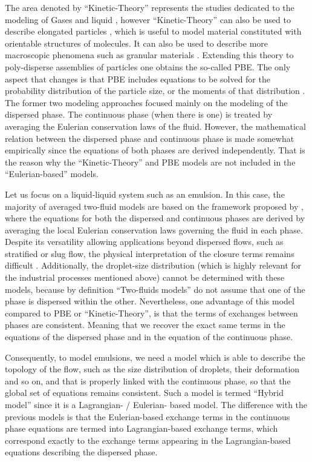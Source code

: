 The area denoted by ``Kinetic-Theory'' represents the studies dedicated to the modeling of Gases and liquid \citep{hansen2013theory,kardar2007statistical}, however  
``Kinetic-Theory'' can also be used to describe elongated particles \citet{curtiss1956kinetic}, which is useful to model material constituted with orientable structures of molecules.
It can also be used to describe more macroscopic phenomena such as granular materials \citet{rao2008introduction}.  
Extending this theory to poly-disperse assemblies of particles one obtains the so-called PBE. 
The only aspect that changes is that PBE includes equations to be solved for the probability distribution of the particle size, or the moments of that distribution \citep{fox2023generalized,randolph2012theory}. 
The former two modeling approaches focused mainly on the modeling of the dispersed phase.
The continuous phase (when there is one) is treated by averaging the Eulerian conservation laws of the fluid. 
However, the mathematical relation between the dispersed phase and continuous phase is made somewhat empirically since the equations of both phases are derived independently. 
That is the reason why the ``Kinetic-Theory'' and PBE models are not included in the ``Eulerian-based'' models. 

Let us focus on a liquid-liquid system such as an emulsion. 
In this case, the majority of averaged two-fluid models are based on the framework proposed by \citet{drew1983mathematical}, where the equations for both the dispersed and continuous phases are derived by averaging the local Eulerian conservation laws governing the fluid in each phase.
Despite its versatility allowing applications beyond dispersed flows, such as stratified or slug flow, the physical interpretation of the closure terms remains difficult \citep{drew1983mathematical}.
Additionally, the droplet-size distribution (which is highly relevant for the industrial processes mentioned above) cannot be determined with these models, because by definition ``Two-fluids models'' do not assume that one of the phase is dispersed within the other.
Nevertheless, one advantage of this model compared to PBE or ``Kinetic-Theory'', is that the terms of exchanges between phases are consistent. 
Meaning that we recover the exact same terms in the equations of the dispersed phase and in the equation of the continuous phase. 

Consequently, to model emulsions, we need a model  which is able to describe the topology of the flow, such as the size distribution of droplets, their deformation and so on, and that is properly linked with the continuous phase, so that the global set of equations remains consistent. 
Such a model is termed ``Hybrid model'' since it is a Lagrangian- / Eulerian- based model.
The difference with the previous models is that the Eulerian-based exchange terms in the continuous phase equations are termed into Lagrangian-based exchange terms, which correspond exactly to the exchange terms appearing in the Lagrangian-based equations describing the dispersed phase. 

